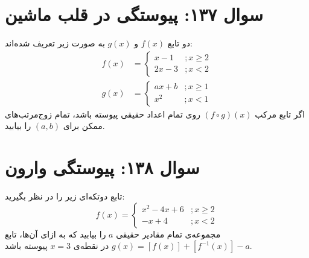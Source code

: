 \documentclass[12pt]{article}
\begin{document}
\vspace{1cm}
\hrulefill
\vspace{1cm}

\section*{سوال ۱۳۷: پیوستگی در قلب ماشین}
دو تابع \(f(x)\) و \(g(x)\) به صورت زیر تعریف شده‌اند:
\begin{align*}
	f(x) &= \begin{cases} x-1 &; x \ge 2 \\ 2x-3 &; x < 2 \end{cases} \\
	g(x) &= \begin{cases} ax+b &; x \ge 1 \\ x^2 &; x < 1 \end{cases}
\end{align*}
اگر تابع مرکب \( (f \circ g)(x) \) روی تمام اعداد حقیقی پیوسته باشد، تمام زوج‌مرتب‌های ممکن برای \( (a,b) \) را بیابید.

\vspace{1cm}
\hrulefill
\vspace{1cm}

\section*{سوال ۱۳۸: پیوستگی وارون}
تابع دوتکه‌ای زیر را در نظر بگیرید:
\begin{displaymath}
	f(x) = 
	\begin{cases}
		x^2 - 4x + 6 & ; x \ge 2 \\
		-x+4 & ; x < 2
	\end{cases}
\end{displaymath}
مجموعه‌ی تمام مقادیر حقیقی \(a\) را بیابید که به ازای آن‌ها، تابع \( g(x) = [f(x)] + [f^{-1}(x)] - a \) در نقطه‌ی \(x=3\) پیوسته باشد.

\vspace{1cm}
\hrulefill
\vspace{1cm}

\end{document}
